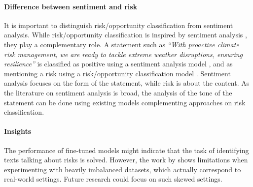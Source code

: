 \paragraph{Difference between sentiment and risk} It is important to distinguish risk/opportunity classification from sentiment analysis. While risk/opportunity classification is inspired by sentiment analysis \cite{bingler2023cheaptalkspecificitysentiment}, they play a complementary role. A statement such as \textit{``With proactive climate risk management, we are ready to tackle extreme weather disruptions, ensuring resilience''} is classified as positive using a sentiment analysis model \cite{perez2021pysentimiento}, and as mentioning a risk using a risk/opportunity classification model \cite{bingler2023cheaptalkspecificitysentiment}. Sentiment analysis focuses on the form of the statement, while risk is about the content. As the literature on sentiment analysis \cite{Wankhade2022} is broad, the analysis of the tone of the statement can be done using existing models \cite{marco_polignano_nlp_2022, hyewon_kang_analyzing_2022} complementing approaches on risk classification. 

\paragraph{Insights} The performance of fine-tuned models might indicate that the task of identifying texts talking about risks is solved. However, the work by \citet{Friederich_climate_risk_disclosure} shows limitations when experimenting with heavily imbalanced datasets, which actually correspond to real-world settings. Future research could focus on such skewed settings.


